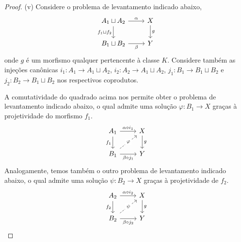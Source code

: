 \begin{proof}
  \smallskip
  (v) Considere o problema de levantamento indicado abaixo,
  \begin{equation}\label{eq:coproduto_proj_diag_1}
    \begin{tikzcd}
      A_1 \sqcup A_2
      \arrow[r, "\alpha"]
      \arrow[d, "f_1 \sqcup f_2" swap]
      & X
      \arrow[d, "g"]
      \\ B_1 \sqcup B_2
      \arrow[r, "\beta" swap]
      & Y
    \end{tikzcd}
  \end{equation}
  onde $g$ é um morfismo qualquer pertencente à classe $K$.
  Considere também as injeções canônicas $i_1: A_1 \to A_1 \sqcup A_2$, $i_2: A_2 \to A_1 \sqcup A_2$, $j_1: B_1 \to B_1 \sqcup B_2$ e $j_2: B_2 \to B_1 \sqcup B_2$ nos respectivos coprodutos.

  A comutatividade do quadrado acima nos permite obter o problema de levantamento indicado abaixo, o qual admite uma solução $\varphi: B_1 \to X$ graças à projetividade do morfismo $f_1$.
  \begin{equation}\label{eq:coproduto_proj_diag_2}
    \begin{tikzcd}
      A_1
      \arrow[r, "\alpha \circ i_1"]
      \arrow[d, "f_1" swap]
      & X
      \arrow[d, "g"]
      \\ B_1
      \arrow[r, "\beta \circ j_1" swap]
      \arrow[ru, dashed, "\varphi" description]
      & Y
    \end{tikzcd}
  \end{equation}
  Analogamente, temos também o outro problema de levantamento indicado abaixo, o qual admite uma solução $\psi: B_2 \to X$ graças à projetividade de $f_2$.
  \begin{equation}\label{eq:coproduto_proj_diag_3}
    \begin{tikzcd}
      A_2
      \arrow[r, "\alpha \circ i_2"]
      \arrow[d, "f_2" swap]
      & X
      \arrow[d, "g"]
      \\ B_2
      \arrow[r, "\beta \circ j_2" swap]
      \arrow[ru, dashed, "\psi" description]
      & Y
    \end{tikzcd}
  \end{equation}


\end{proof}
